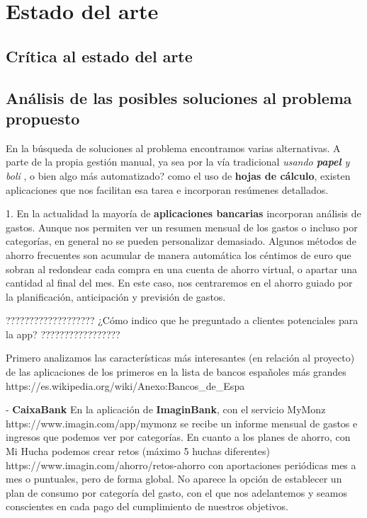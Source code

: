\chapter{Estado del arte}
\section{Crítica al estado del arte}

\section{Análisis de las posibles soluciones al problema propuesto}
En la búsqueda de soluciones al problema encontramos varias alternativas. A parte 
de la propia gestión manual, ya sea por la vía tradicional \textit{usando \textbf{papel} y boli} , 
o bien algo más automatizado? como el uso de \textbf{hojas de cálculo}, existen aplicaciones 
que nos facilitan esa tarea e incorporan resúmenes detallados. 

1. En la actualidad la mayoría de \textbf{aplicaciones bancarias} incorporan análisis de gastos. 
Aunque nos permiten ver un resumen mensual de los gastos o incluso por categorías, en 
general no se pueden personalizar demasiado. Algunos métodos de ahorro frecuentes son acumular 
de manera automática los céntimos de euro que sobran al redondear cada compra en una cuenta 
de ahorro virtual, o apartar una cantidad al final del mes. En este caso, nos centraremos 
en el ahorro guiado por la planificación, anticipación y previsión de gastos.

???????????????????
¿Cómo indico que he preguntado a clientes potenciales para la app?
?????????????????

Primero analizamos las características más interesantes (en relación al proyecto) 
de las aplicaciones de los primeros en la lista 
de bancos españoles más grandes https://es.wikipedia.org/wiki/Anexo:Bancos_de_Espa%

- \textbf{CaixaBank} En la aplicación de \textbf{ImaginBank}, con el servicio MyMonz https://www.imagin.com/app/mymonz 
se recibe un informe mensual de gastos e ingresos que podemos ver por categorías. 
En cuanto a los planes de ahorro, con Mi Hucha podemos crear retos (máximo 5 huchas diferentes) 
https://www.imagin.com/ahorro/retos-ahorro 
con aportaciones periódicas mes a mes o puntuales, pero de forma global.
No aparece la opción de establecer un plan de consumo por categoría del gasto, 
con el que nos adelantemos y seamos conscientes en cada pago del cumplimiento 
de nuestros objetivos. 

